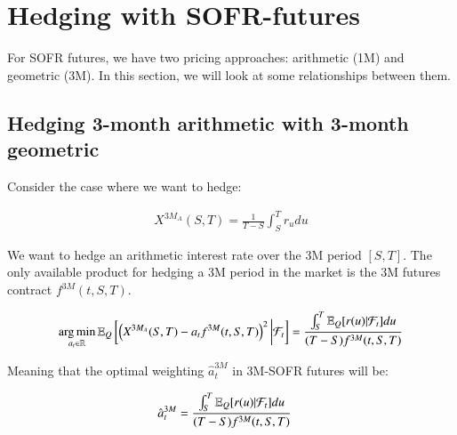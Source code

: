 \newpage 

\section{Hedging with SOFR-futures}
For SOFR futures, we have two pricing approaches: arithmetic (1M) and geometric (3M). In this section, we will look at some relationships between them.


\subsection{Hedging 3-month arithmetic with 3-month geometric}
Consider the case where we want to hedge:

\begin{align}
\label{eq: X_3MA(S,T)}
X^{3M_{A}}(S,T) = \frac{1}{T-S}\int_{S}^{T}r_{u}du    
\end{align}

We want to hedge an arithmetic interest rate over the 3M period $[S,T]$. The only available product for hedging a 3M period in the market is the 3M futures contract $f^{3M}(t,S,T)$. 

\begin{proposition}
\label{prop: optimal_hedge_arithmetic_3M_geometric}
\begin{align*}
\operatorname*{arg\,min}\limits_{a_{t} \in \mathbb{R}}\mathbb{E}_{Q}\left[
\left(
X^{3M_{A}}(S,T)-a_{t}f^{3M}(t,S,T)
\right)^{2}
\bigg{|}\mathcal{F}_{t}
\right] 
= \frac{
\int_{S}^{T}\mathbb{E}_{Q}[r(u)|\mathcal{F}_{t}]du
}{
(T-S)f^{3M}(t,S,T)
}
\end{align*}

Meaning that the optimal weighting $\hat{a}_{t}^{3M}$ in 3M-SOFR futures will be: 

\begin{align*}
\hat{a}_{t}^{3M} &= \frac{
\int_{S}^{T}\mathbb{E}_{Q}[r(u)|\mathcal{F}_{t}]du
}{
(T-S)f^{3M}(t,S,T)
}   
\end{align*}
\end{proposition}

